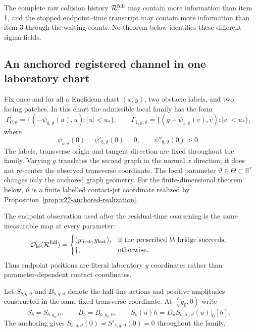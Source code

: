 The complete raw collision history $\mathcal R^{\rm full}$ may contain more
information than item 1, and the stopped endpoint--time transcript may contain
more information than item 3 through the waiting counts.  No theorem below
identifies these different sigma-fields.

\subsection{An anchored registered channel in one laboratory chart}

Fix once and for all a Euclidean chart $(x,y)$, two obstacle labels, and two
facing patches.  In this chart the admissible local family has the form
\begin{equation}\label{eq:v22-anchored-graphs}
 \Gamma_{0,\vartheta}=\{(-\psi_{0,\vartheta}(u),u):|u|<u_*\},
 \qquad
 \Gamma_{1,g,\vartheta}=\{(g+\psi_{1,\vartheta}(v),v):|v|<u_*\},
\end{equation}
where
\begin{equation}\label{eq:v22-anchor-normalization}
 \psi_{b,\vartheta}(0)=\psi'_{b,\vartheta}(0)=0,
 \qquad \psi''_{b,\vartheta}(0)>0.
\end{equation}
The labels, transverse origin and tangent direction are fixed throughout the
family.  Varying $g$ translates the second graph in the normal $x$ direction;
it does not re-center the observed transverse coordinate.  The local
parameter $\vartheta\in\Theta\subset\mathbb R^r$ changes only the anchored
graph geometry.  For the finite-dimensional theorem below, $\vartheta$ is a
finite labelled contact-jet coordinate realized by
Proposition~\ref{prop:v22-anchored-realization}.

The endpoint observation used after the residual-time coarsening is the same
measurable map at every parameter:
\begin{equation}\label{eq:v22-laboratory-endpoint-map}
 \mathcal O_{bb}(\mathcal R^{\rm full})=
 \begin{cases}
 (y_{\rm first},y_{\rm last}),&\text{if the prescribed $bb$ bridge succeeds},\\
 \dagger,&\text{otherwise}.
 \end{cases}
\end{equation}
Thus endpoint positions are literal laboratory $y$ coordinates rather than
parameter-dependent contact coordinates.

Let $S_{b,g,\vartheta}$ and $B_{b,g,\vartheta}$ denote the half-line actions
and positive amplitudes constructed in the same fixed transverse coordinate.
At $(g_0,0)$ write
\[
 S_b=S_{b,g_0,0},\qquad B_b=B_{b,g_0,0},\qquad
 \dot S_b(u)h=D_\vartheta S_{b,g_0,\vartheta}(u)|_0[h].
\]
The anchoring gives
$S_{b,g,\vartheta}(0)=S'_{b,g,\vartheta}(0)=0$ throughout the family.

